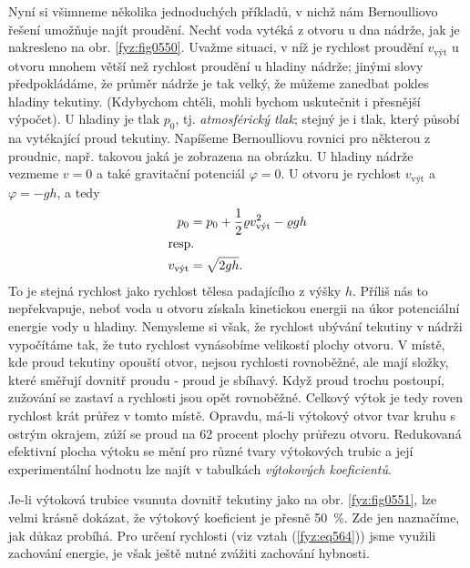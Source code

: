     Nyní si všimneme několika jednoduchých příkladů, v nichž nám Bernoulliovo řešení umožňuje najít 
    proudění. Nechť voda vytéká z otvoru u dna nádrže, jak je nakresleno na obr. \ref{fyz:fig0550}. 
    Uvažme situaci, v níž je rychlost proudění \(v_{\text{výt}}\) u otvoru mnohem větší než 
    rychlost proudění u hladiny nádrže; jinými slovy předpokládáme, že průměr nádrže je tak velký, 
    že můžeme zanedbat pokles hladiny tekutiny. (Kdybychom chtěli, mohli bychom uskutečnit i 
    přesnější výpočet). U hladiny je tlak \(p_0\), tj. \emph{atmosférický tlak}; stejný je i tlak, 
    který působí na vytékající proud tekutiny. Napíšeme Bernoulliovu rovnici pro některou z 
    proudnic, např. takovou jaká je zobrazena na obrázku. U hladiny nádrže vezmeme \(v = 0\) a také 
    gravitační potenciál \(\varphi = 0\). U otvoru je rychlost \(v_{\text{výt}}\) a \(\varphi= 
    -gh\), a tedy
    \begin{align}
      p_0 &= p_0 + \dfrac{1}{2}\varrho v_{\text{výt}}^2 - \varrho gh \nonumber \\
      \shortintertext{resp.}
      v_{\text{výt}} &= \sqrt{2gh}.                                   \label{fyz:eq564}
    \end{align}
    To je stejná rychlost jako rychlost tělesa padajícího z výšky \(h\). Příliš nás to 
    nepřekvapuje, neboť voda u otvoru získala kinetickou energii na úkor potenciální energie vody u 
    hladiny. Nemysleme si však, že rychlost ubývání tekutiny v nádrži vypočítáme tak, že tuto 
    rychlost vynásobíme velikostí plochy otvoru. V místě, kde proud tekutiny opouští otvor, nejsou 
    rychlosti rovnoběžné, ale mají složky, které směřují dovnitř proudu - proud je sbíhavý. Když 
    proud trochu postoupí, zužování se zastaví a rychlosti jsou opět rovnoběžné. Celkový výtok je 
    tedy roven rychlost krát průřez v tomto místě. Opravdu, má-li výtokový otvor tvar kruhu s 
    ostrým okrajem, zúží se proud na \num{62} procent plochy průřezu otvoru. Redukovaná efektivní 
    plocha výtoku se mění pro různé tvary výtokových trubic a její experimentální hodnotu lze najít 
    v tabulkách \emph{výtokových koeficientů}.
    
    Je-li výtoková trubice vsunuta dovnitř tekutiny jako na obr. \ref{fyz:fig0551}, lze velmi krásně 
    dokázat, že výtokový koeficient je přesně \SI{50}{\percent}. Zde jen naznačíme, jak důkaz 
    probíhá. Pro určení rychlosti (viz vztah (\ref{fyz:eq564})) jsme využili zachování energie, je 
    však ještě nutné zvážiti zachování hybnosti.
    

